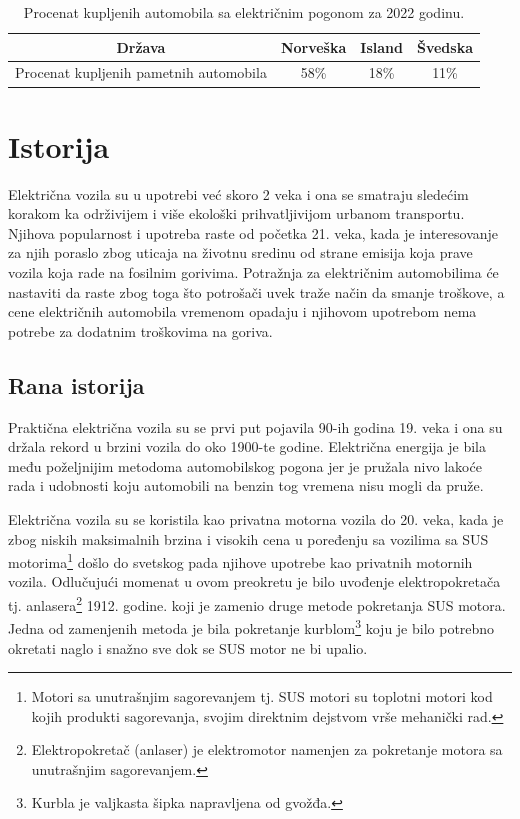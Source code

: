 \documentclass[a4paper]{article}
\begin{document}
\newpage




\begin{table}[h!]
\begin{center}
\caption{Procenat kupljenih automobila sa električnim pogonom za 2022 godinu.}
\begin{tabular}{|c|c|c|c|} \hline
Država& Norveška& Island& Švedska\\ \hline
Procenat kupljenih pametnih automobila& 58\%& 18\%& 11\%\\ \hline
\end{tabular}
\label{tab:tabela1}
\end{center}
\end{table}






\section{Istorija}
\label{sec:naslov1}


Električna vozila su u upotrebi već skoro 2 veka i ona se smatraju sledećim korakom ka održivijem i više ekološki prihvatljivijom urbanom transportu. Njihova popularnost i upotreba raste od početka 21. veka, kada je interesovanje za njih poraslo zbog uticaja na životnu sredinu od strane emisija koja prave vozila koja rade na fosilnim gorivima. Potražnja za električnim automobilima će nastaviti da raste zbog toga što potrošači uvek traže način da smanje troškove, a cene električnih automobila vremenom opadaju i njihovom upotrebom nema potrebe za dodatnim troškovima na goriva.


\subsection{Rana istorija}
\label{subsec:podnaslov1}

Praktična električna vozila su se prvi put pojavila 90-ih godina 19. veka i ona su držala rekord u brzini vozila do oko 1900-te godine. Električna energija je bila među poželjnijim metodoma automobilskog pogona jer je pružala nivo lakoće rada i udobnosti koju automobili na benzin tog vremena nisu mogli da pruže.

Električna vozila su se koristila kao privatna motorna vozila do 20. veka, kada je zbog niskih maksimalnih brzina i visokih cena u poređenju sa vozilima sa SUS motorima\footnote{Motori sa unutrašnjim sagorevanjem tj. SUS motori su toplotni motori kod kojih produkti sagorevanja, svojim direktnim dejstvom vrše mehanički rad.} došlo do svetskog pada njihove upotrebe kao privatnih motornih vozila. Odlučujući momenat u ovom preokretu je bilo uvođenje elektropokretača tj. anlasera\footnote{Elektropokretač (anlaser) je elektromotor namenjen za pokretanje motora sa unutrašnjim sagorevanjem.} 1912. godine. koji je zamenio druge metode pokretanja SUS motora. Jedna od zamenjenih metoda je bila pokretanje kurblom\footnote{Kurbla je valjkasta šipka napravljena od gvožđa.} koju je bilo potrebno okretati naglo i snažno sve dok se SUS motor ne bi upalio.
\end{document}
